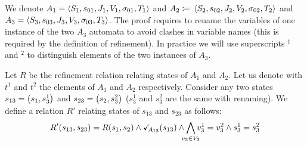 \documentclass[runningheads]{llncs}
\begin{document}
We denote $A_1=  \left<S_1,s_{01},J_1,V_1,\sigma_{01},T_1\right>$ and \(A_2 \defobject \OA{S_2}{s_{02}}{J_2}{V_2}{\sigma_{02}}{T_2}\) and $A_3 = \left<S_3,s_{03},J_3,V_3,\sigma_{03},T_3\right>$. The proof requires  to rename the variables of one instance of the two $A_3$ automata to avoid clashes in variable names (this is required by the definition of refinement). In practice we will use superscripts ${}^1$ and ${}^2$ to distinguish elements of the two instances of $A_3$.

Let $R$ be the refinement relation relating states of $A_1$ and $A_2$. 
Let us denote with $t^1$ and $t^2$  the elements of $A_1$ and $A_2$ respectively.
Consider any two states $s_{13} = {\left(s_1,s^1_3\right)}$ and $s_{23} = {\left(s_2,s^2_3\right)}$ ($s^1_3$ and $s^2_3$  are the same with renaming). We define a relation $R'$ relating states of $s_{13}$ and $s_{23}$ as follows:
\[ R' \mpar{s_{13}, s_{23}} = R\mpar{s_{1}, s_{2}} \wedge \reach{A_{13}}\mpar{s_{13}} \wedge \bigwedge_\subbox{v_3\in V_3}
 v^1_3=v^2_3\wedge s^1_3 = s^2_3\]

\end{document}
